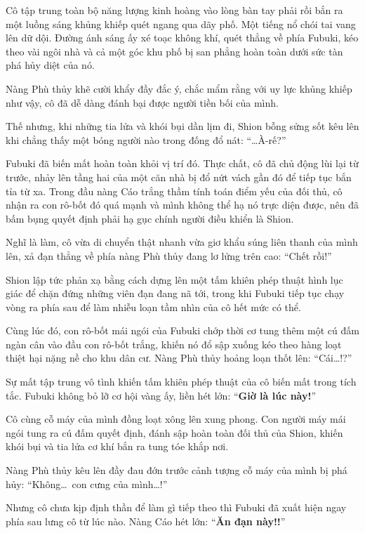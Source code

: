 \documentclass[../main.tex]{subfiles}
\begin{document}
Cô tập trung toàn bộ năng lượng kinh hoàng vào lòng bàn tay phải rồi bắn ra một luồng sáng khủng khiếp quét ngang qua dãy phố. Một tiếng nổ chói tai vang lên dữ dội. Đường ánh sáng ấy xé toạc không khí, quét thẳng về phía Fubuki, kéo theo vài ngôi nhà và cả một góc khu phố bị san phẳng hoàn toàn dưới sức tàn phá hủy diệt của nó.

Nàng Phù thủy khẽ cười khẩy đầy đắc ý, chắc mẩm rằng với uy lực khủng khiếp như vậy, cô đã dễ dàng đánh bại được người tiền bối của mình.

Thế nhưng, khi những tia lửa và khói bụi dần lịm đi, Shion bỗng sửng sốt kêu lên khi chẳng thấy một bóng người nào trong đống đổ nát: ``\dots À-rế?''

Fubuki đã biến mất hoàn toàn khỏi vị trí đó. Thực chất, cô đã chủ động lùi lại từ trước, nhảy lên tầng hai của một căn nhà bị đổ nứt vách gần đó để tiếp tục bắn tỉa từ xa. Trong đầu nàng Cáo trắng thầm tính toán điểm yếu của đối thủ, cô nhận ra con rô-bốt đó quá mạnh và mình không thể hạ nó trực diện được, nên đã bấm bụng quyết định phải hạ gục chính người điều khiển là Shion.

Nghĩ là làm, cô vừa di chuyển thật nhanh vừa giơ khẩu súng liên thanh của mình lên, xả đạn thẳng về phía nàng Phù thủy đang lơ lửng trên cao: ``Chết rồi!''

Shion lập tức phản xạ bằng cách dựng lên một tấm khiên phép thuật hình lục giác để chặn đứng những viên đạn đang nã tới, trong khi Fubuki tiếp tục chạy vòng ra phía sau để làm nhiễu loạn tầm nhìn của cô hết mức có thể.

Cùng lúc đó, con rô-bốt mái ngói của Fubuki chớp thời cơ tung thêm một cú đấm ngàn cân vào đầu con rô-bốt trắng, khiến nó đổ sập xuống kéo theo hàng loạt thiệt hại nặng nề cho khu dân cư. Nàng Phù thủy hoảng loạn thốt lên: ``Cái\dots!?''

Sự mất tập trung vô tình khiến tấm khiên phép thuật của cô biến mất trong tích tắc. Fubuki không bỏ lỡ cơ hội vàng ấy, liền hét lớn: ``\textbf{Giờ là lúc này!}''

Cô cùng cỗ máy của mình đồng loạt xông lên xung phong. Con người máy mái ngói tung ra cú đấm quyết định, đánh sập hoàn toàn đối thủ của Shion, khiến khói bụi và tia lửa cơ khí bắn ra tung tóe khắp nơi.

Nàng Phù thủy kêu lên đầy đau đớn trước cảnh tượng cỗ máy của mình bị phá hủy: ``Không\dots\ con cưng của mình\dots!''

Nhưng cô chưa kịp định thần để làm gì tiếp theo thì Fubuki đã xuất hiện ngay phía sau lưng cô từ lúc nào. Nàng Cáo hét lớn: ``\textbf{Ăn đạn này!!}''
\end{document}

